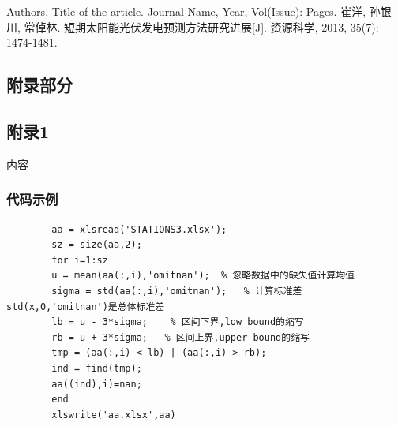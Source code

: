 \documentclass[12pt, a4paper, oneside]{ctexart}
\begin{document}
\newpage%

\begin{thebibliography}{99}
	 Authors. Title of the article. Journal Name, Year, Vol(Issue): Pages.
	 崔洋, 孙银川, 常倬林. 短期太阳能光伏发电预测方法研究进展[J]. 资源科学, 2013, 35(7): 1474-1481.
\end{thebibliography}




\newpage

\begin{appendices}
	\renewcommand{\thesection}{\Alph{section}}
	\section{附录部分}
	\subsection{附录1}
	内容
	\subsubsection{代码示例}
	\begin{lstlisting}
		aa = xlsread('STATIONS3.xlsx');
		sz = size(aa,2);
		for i=1:sz
		u = mean(aa(:,i),'omitnan');  % 忽略数据中的缺失值计算均值
		sigma = std(aa(:,i),'omitnan');   % 计算标准差  std(x,0,'omitnan')是总体标准差
		lb = u - 3*sigma;    % 区间下界,low bound的缩写
		rb = u + 3*sigma;   % 区间上界,upper bound的缩写
		tmp = (aa(:,i) < lb) | (aa(:,i) > rb);
		ind = find(tmp);
		aa((ind),i)=nan;
		end
		xlswrite('aa.xlsx',aa)
	\end{lstlisting}
	

\end{appendices}
\end{document}
